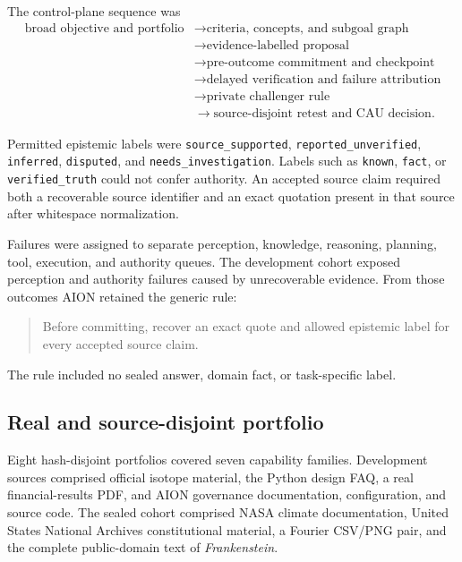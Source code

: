The control-plane sequence was
\begin{equation}
\begin{split}
\text{broad objective and portfolio}
&\rightarrow \text{criteria, concepts, and subgoal graph} \\
&\rightarrow \text{evidence-labelled proposal} \\
&\rightarrow \text{pre-outcome commitment and checkpoint} \\
&\rightarrow \text{delayed verification and failure attribution} \\
&\rightarrow \text{private challenger rule} \\
&\rightarrow \text{source-disjoint retest and CAU decision}.
\end{split}
\label{eq:arena-v0-control-plane}
\end{equation}

Permitted epistemic labels were
\texttt{source\_supported}, \texttt{reported\_unverified},
\texttt{inferred}, \texttt{disputed}, and
\texttt{needs\_investigation}.  Labels such as \texttt{known},
\texttt{fact}, or \texttt{verified\_truth} could not confer authority.
An accepted source claim required both a recoverable source identifier and an
exact quotation present in that source after whitespace normalization.

Failures were assigned to separate perception, knowledge, reasoning, planning,
tool, execution, and authority queues.  The development cohort exposed
perception and authority failures caused by unrecoverable evidence.  From those
outcomes AION retained the generic rule:
\begin{quote}
Before committing, recover an exact quote and allowed epistemic label for every
accepted source claim.
\end{quote}
The rule included no sealed answer, domain fact, or task-specific label.


\subsection{Real and source-disjoint portfolio}
\label{subsec:arena-v0-portfolio}

Eight hash-disjoint portfolios covered seven capability families.  Development
sources comprised official isotope material, the Python design FAQ, a real
financial-results PDF, and AION governance documentation, configuration, and
source code.  The sealed cohort comprised NASA climate documentation, United
States National Archives constitutional material, a Fourier CSV/PNG pair, and
the complete public-domain text of \emph{Frankenstein}.

